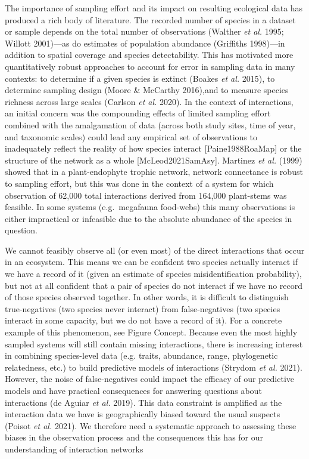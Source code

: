 \documentclass[11pt]{article}
\begin{document}
The importance of sampling effort and its impact on resulting ecological
data has produced a rich body of literature. The recorded number of
species in a dataset or sample depends on the total number of
observations (Walther \emph{et al.} 1995; Willott 2001)---as do
estimates of population abundance (Griffiths 1998)---in addition to
spatial coverage and species detectability. This has motivated more
quantitatively robust approaches to account for error in sampling data
in many contexts: to determine if a given species is extinct (Boakes
\emph{et al.} 2015), to determine sampling design (Moore \& McCarthy
2016),and to measure species richness across large scales (Carlson
\emph{et al.} 2020). In the context of interactions, an initial concern
was the compounding effects of limited sampling effort combined with the
amalgamation of data (across both study sites, time of year, and
taxonomic scales) could lead any empirical set of observations to
inadequately reflect the reality of how species interact
{[}Paine1988RoaMap{]} or the structure of the network as a whole
{[}McLeod2021SamAsy{]}. Martinez \emph{et al.} (1999) showed that in a
plant-endophyte trophic network, network connectance is robust to
sampling effort, but this was done in the context of a system for which
observation of 62,000 total interactions derived from 164,000
plant-stems was feasible. In some systems (e.g.~megafauna food-webs)
this many observations is either impractical or infeasible due to the
absolute abundance of the species in question.

We cannot feasibly observe all (or even most) of the direct interactions
that occur in an ecosystem. This means we can be confident two species
actually interact if we have a record of it (given an estimate of
species misidentification probability), but not at all confident that a
pair of species do not interact if we have no record of those species
observed together. In other words, it is difficult to distinguish
true-negatives (two species never interact) from false-negatives (two
species interact in some capacity, but we do not have a record of it).
For a concrete example of this phenomenon, see Figure Concept. Because
even the most highly sampled systems will still contain missing
interactions, there is increasing interest in combining species-level
data (e.g. traits, abundance, range, phylogenetic relatedness, etc.) to
build predictive models of interactions (Strydom \emph{et al.} 2021).
However, the noise of false-negatives could impact the efficacy of our
predictive models and have practical consequences for answering
questions about interactions (de Aguiar \emph{et al.} 2019). This data
constraint is amplified as the interaction data we have is
geographically biased toward the usual suspects (Poisot \emph{et al.}
2021). We therefore need a systematic approach to assessing these biases
in the observation process and the consequences this has for our
understanding of interaction networks
\end{document}
